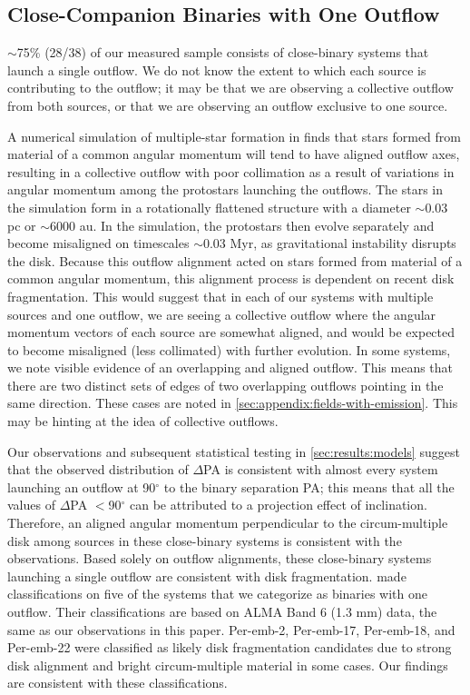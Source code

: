 \documentclass[linenumbers,twocolumn, twocolappendix]{aastex631}
\begin{document}
\subsection{Close-Companion Binaries with One Outflow} \label{sec:dis:binaries-one-outflow}
$\sim$75\% (28/38) of our measured sample consists of close-binary systems that launch a single outflow. We do not know the extent to which each source is contributing to the outflow; it may be that we are observing a collective outflow from both sources, or that we are observing an outflow exclusive to one source. 

A numerical simulation of multiple-star formation in \cite{Peters_et_al_2014} finds that stars formed from material of a common angular momentum will tend to have aligned outflow axes, resulting in a collective outflow with poor collimation as a result of variations in angular momentum among the protostars launching the outflows. The stars in the simulation form in a rotationally flattened structure with a diameter $\sim$0.03 pc or $\sim$6000 au. In the simulation, the protostars then evolve separately and become misaligned on timescales $\sim$0.03 Myr, as gravitational instability disrupts the disk. Because this outflow alignment acted on stars formed from material of a common angular momentum, this alignment process is dependent on recent disk fragmentation. This would suggest that in each of our systems with multiple sources and one outflow, we are seeing a collective outflow where the angular momentum vectors of each source are somewhat aligned, and would be expected to become misaligned (less collimated) with further evolution. In some systems, we note visible evidence of an overlapping and aligned outflow. This means that there are two distinct sets of edges of two overlapping outflows pointing in the same direction. These cases are noted in \ref{sec:appendix:fields-with-emission}. This may be hinting at the idea of collective outflows. 

Our observations and subsequent statistical testing in \ref{sec:results:models} suggest that the observed distribution of $\Delta$PA is consistent with almost every system launching an outflow at 90$^\circ$ to the binary separation PA; this means that all the values of $\Delta$PA $<$90$^\circ$ can be attributed to a projection effect of inclination. Therefore, an aligned angular momentum perpendicular to the circum-multiple disk among sources in these close-binary systems is consistent with the observations. Based solely on outflow alignments, these close-binary systems launching a single outflow are consistent with disk fragmentation. \cite{Reynolds_et_al_2024} made classifications on five of the systems that we categorize as binaries with one outflow. Their classifications are based on ALMA Band 6 (1.3 mm) data, the same as our observations in this paper. Per-emb-2, Per-emb-17, Per-emb-18, and Per-emb-22 were classified as likely disk fragmentation candidates due to strong disk alignment and bright circum-multiple material in some cases. Our findings are consistent with these classifications.
\end{document}
